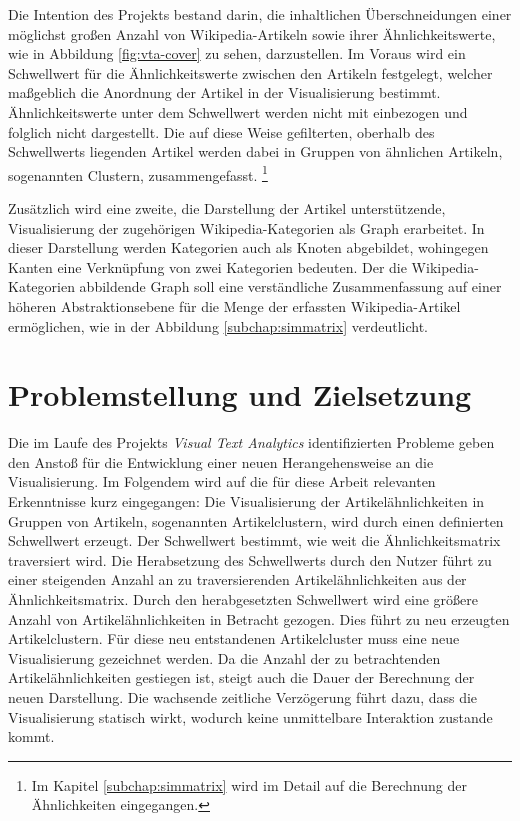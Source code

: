 Die Intention des Projekts bestand darin, die inhaltlichen Überschneidungen einer möglichst großen Anzahl von Wikipedia-Artikeln sowie ihrer Ähnlichkeitswerte, wie in Abbildung \ref{fig:vta-cover} zu sehen, darzustellen.
Im Voraus wird ein Schwellwert für die Ähnlichkeitswerte zwischen den Artikeln festgelegt, welcher maßgeblich die Anordnung der Artikel in der Visualisierung bestimmt.
Ähnlichkeitswerte unter dem Schwellwert werden nicht mit einbezogen und folglich nicht dargestellt. 
Die auf diese Weise gefilterten, oberhalb des Schwellwerts liegenden Artikel werden dabei in Gruppen von ähnlichen Artikeln, sogenannten Clustern, zusammengefasst.
\footnote{Im Kapitel \ref{subchap:simmatrix} wird im Detail auf die Berechnung der Ähnlichkeiten eingegangen.}

Zusätzlich wird eine zweite, die Darstellung der Artikel unterstützende, Visualisierung der zugehörigen Wikipedia-Kategorien als Graph erarbeitet.
In dieser Darstellung werden Kategorien auch als Knoten abgebildet, wohingegen Kanten eine Verknüpfung von zwei Kategorien bedeuten.
Der die Wikipedia-Kategorien abbildende Graph soll eine verständliche Zusammenfassung auf einer höheren Abstraktionsebene für die Menge der erfassten Wikipedia-Artikel ermöglichen, wie in der Abbildung \ref{subchap:simmatrix} verdeutlicht.



\section{Problemstellung und Zielsetzung}
Die im Laufe des Projekts \emph{Visual Text Analytics} identifizierten Probleme geben den Anstoß für die Entwicklung einer neuen Herangehensweise an die Visualisierung.
Im Folgendem wird auf die für diese Arbeit relevanten Erkenntnisse kurz eingegangen:
Die Visualisierung der Artikelähnlichkeiten in Gruppen von Artikeln, sogenannten Artikelclustern, wird durch einen definierten Schwellwert erzeugt.
Der Schwellwert bestimmt, wie weit die Ähnlichkeitsmatrix traversiert wird.
Die Herabsetzung des Schwellwerts durch den Nutzer führt zu einer steigenden Anzahl an zu traversierenden Artikelähnlichkeiten aus der Ähnlichkeitsmatrix.
Durch den herabgesetzten Schwellwert wird eine größere Anzahl von Artikelähnlichkeiten in Betracht gezogen.
Dies führt zu neu erzeugten Artikelclustern.
Für diese neu entstandenen Artikelcluster muss eine neue Visualisierung gezeichnet werden.
Da die Anzahl der zu betrachtenden Artikelähnlichkeiten gestiegen ist, steigt auch die Dauer der Berechnung der neuen Darstellung.
Die wachsende zeitliche Verzögerung führt dazu, dass die Visualisierung statisch wirkt, wodurch keine unmittelbare Interaktion zustande kommt.

